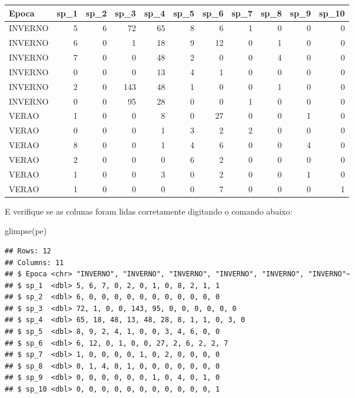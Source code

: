 \documentclass[
]{book}
\newenvironment{Shaded}{\begin{snugshade}}{\end{snugshade}}
\newcommand{\FunctionTok}[1]{\textcolor[rgb]{0.00,0.00,0.00}{#1}}
\newcommand{\NormalTok}[1]{#1}
\begin{document}
\begin{tabular}{l|r|r|r|r|r|r|r|r|r|r}
\hline
Epoca & sp\_1 & sp\_2 & sp\_3 & sp\_4 & sp\_5 & sp\_6 & sp\_7 & sp\_8 & sp\_9 & sp\_10\\
\hline
INVERNO & 5 & 6 & 72 & 65 & 8 & 6 & 1 & 0 & 0 & 0\\
\hline
INVERNO & 6 & 0 & 1 & 18 & 9 & 12 & 0 & 1 & 0 & 0\\
\hline
INVERNO & 7 & 0 & 0 & 48 & 2 & 0 & 0 & 4 & 0 & 0\\
\hline
INVERNO & 0 & 0 & 0 & 13 & 4 & 1 & 0 & 0 & 0 & 0\\
\hline
INVERNO & 2 & 0 & 143 & 48 & 1 & 0 & 0 & 1 & 0 & 0\\
\hline
INVERNO & 0 & 0 & 95 & 28 & 0 & 0 & 1 & 0 & 0 & 0\\
\hline
VERAO & 1 & 0 & 0 & 8 & 0 & 27 & 0 & 0 & 1 & 0\\
\hline
VERAO & 0 & 0 & 0 & 1 & 3 & 2 & 2 & 0 & 0 & 0\\
\hline
VERAO & 8 & 0 & 0 & 1 & 4 & 6 & 0 & 0 & 4 & 0\\
\hline
VERAO & 2 & 0 & 0 & 0 & 6 & 2 & 0 & 0 & 0 & 0\\
\hline
VERAO & 1 & 0 & 0 & 3 & 0 & 2 & 0 & 0 & 1 & 0\\
\hline
VERAO & 1 & 0 & 0 & 0 & 0 & 7 & 0 & 0 & 0 & 1\\
\hline
\end{tabular}

E verifique se as colunas foram lidas corretamente digitando o comando abaixo:

\begin{Shaded}
\begin{Highlighting}[]
\FunctionTok{glimpse}\NormalTok{(pe)}
\end{Highlighting}
\end{Shaded}

\begin{verbatim}
## Rows: 12
## Columns: 11
## $ Epoca <chr> "INVERNO", "INVERNO", "INVERNO", "INVERNO", "INVERNO", "INVERNO"~
## $ sp_1  <dbl> 5, 6, 7, 0, 2, 0, 1, 0, 8, 2, 1, 1
## $ sp_2  <dbl> 6, 0, 0, 0, 0, 0, 0, 0, 0, 0, 0, 0
## $ sp_3  <dbl> 72, 1, 0, 0, 143, 95, 0, 0, 0, 0, 0, 0
## $ sp_4  <dbl> 65, 18, 48, 13, 48, 28, 8, 1, 1, 0, 3, 0
## $ sp_5  <dbl> 8, 9, 2, 4, 1, 0, 0, 3, 4, 6, 0, 0
## $ sp_6  <dbl> 6, 12, 0, 1, 0, 0, 27, 2, 6, 2, 2, 7
## $ sp_7  <dbl> 1, 0, 0, 0, 0, 1, 0, 2, 0, 0, 0, 0
## $ sp_8  <dbl> 0, 1, 4, 0, 1, 0, 0, 0, 0, 0, 0, 0
## $ sp_9  <dbl> 0, 0, 0, 0, 0, 0, 1, 0, 4, 0, 1, 0
## $ sp_10 <dbl> 0, 0, 0, 0, 0, 0, 0, 0, 0, 0, 0, 1
\end{verbatim}
\end{document}
